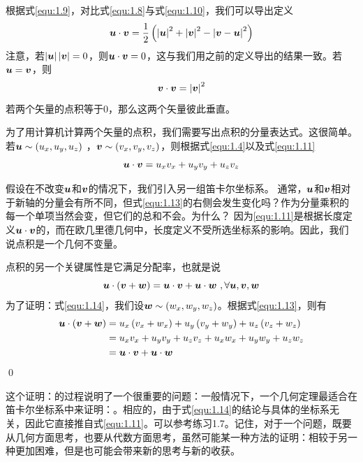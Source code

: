 根据式\eqref{equ:1.9}，对比式\eqref{equ:1.8}与式\eqref{equ:1.10}，我们可以导出定义
\begin{equation}\label{equ:1.11}
    \boldsymbol{u}\cdot \boldsymbol{v}=\frac{1}{2}\left( \left| \boldsymbol{u} \right|^2+\left| \boldsymbol{v} \right|^2-\left| \boldsymbol{v}-\boldsymbol{u} \right|^2 \right) 
\end{equation}
注意，若$\left| \boldsymbol{u} \right|\left| \boldsymbol{v} \right| = 0$，则$\boldsymbol{u}\cdot \boldsymbol{v}=0$，这与我们用之前的定义导出的结果一致。若$\boldsymbol{u}=\boldsymbol{v}$，则
\begin{equation}
    \boldsymbol{v}\cdot \boldsymbol{v}=\left| \boldsymbol{v} \right|^2
\end{equation}
若两个矢量的点积等于0，那么这两个矢量彼此垂直。

为了用计算机计算两个矢量的点积，我们需要写出点积的分量表达式。这很简单。若$\boldsymbol{u}\sim \left( u_x,u_y,u_z \right)$ ，$\boldsymbol{v}\sim \left( v_x,v_y,v_z \right) $，则根据式\eqref{equ:1.4}以及式\eqref{equ:1.11}
\begin{equation}\label{equ:1.13}
    \boldsymbol{u}\cdot \boldsymbol{v}=u_xv_x+u_yv_y+u_zv_z
\end{equation}

假设在不改变$\boldsymbol{u}$和$\boldsymbol{v}$的情况下，我们引入另一组笛卡尔坐标系。 通常，$\boldsymbol{u}$和$\boldsymbol{v}$相对于新轴的分量会有所不同，但式\eqref{equ:1.13}的右侧会发生变化吗？作为分量乘积的每一个单项当然会变，但它们的总和不会。为什么？ 因为\eqref{equ:1.11}是根据长度定义$\boldsymbol{u}\cdot \boldsymbol{v}$的，而在欧几里德几何中，长度定义不受所选坐标系的影响。因此，我们说点积是一个几何不变量。

点积的另一个关键属性是它满足分配率，也就是说
\begin{equation}\label{equ:1.14}
	\boldsymbol{u}\cdot \left( \boldsymbol{v}+\boldsymbol{w} \right) =\boldsymbol{u}\cdot \boldsymbol{v}+\boldsymbol{u}\cdot \boldsymbol{w}\,\, ,  \forall \boldsymbol{u},\boldsymbol{v},\boldsymbol{w}
\end{equation}
为了证明：式\eqref{equ:1.14}，我们设$\boldsymbol{w}\sim \left( w_x,w_y,w_z \right) $。根据式\eqref{equ:1.13}，则有
\begin{align*}
	\boldsymbol{u}\cdot \left( \boldsymbol{v}+\boldsymbol{w} \right) &=u_x\left( v_x+w_x \right) +u_y\left( v_y+w_y \right) +u_z\left( v_z+w_z \right)\\
	&=u_xv_x+u_yv_y+u_zv_z+u_xw_x+u_yw_y+u_zw_z\\
	&=\boldsymbol{u}\cdot \boldsymbol{v}+\boldsymbol{u}\cdot \boldsymbol{w}
\end{align*}
\qed

这个证明：的过程说明了一个很重要的问题：一般情况下，一个几何定理最适合在笛卡尔坐标系中来证明：。相应的，由于式\eqref{equ:1.14}的结论与具体的坐标系无关，因此它直接推自式\eqref{equ:1.11}。可以参考练习1.7。记住，对于一个问题，既要从几何方面思考，也要从代数方面思考，虽然可能某一种方法的证明：相较于另一种更加困难，但是也可能会带来新的思考与新的收获。

